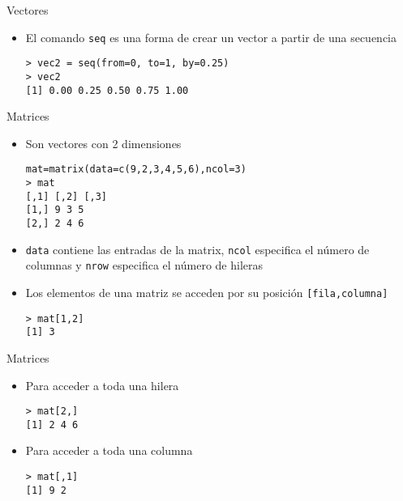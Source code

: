 \documentclass{beamer}
\begin{document}
\begin{frame}[fragile]{Vectores}
\begin{itemize}
\item El comando \verb=seq= es una forma de crear un vector a partir de una secuencia
\begin{verbatim}
> vec2 = seq(from=0, to=1, by=0.25)
> vec2
[1] 0.00 0.25 0.50 0.75 1.00
\end{verbatim}
\end{itemize}
\end{frame}

\begin{frame}[fragile]{Matrices}
\begin{itemize}
\item Son vectores con 2 dimensiones
\begin{verbatim}
mat=matrix(data=c(9,2,3,4,5,6),ncol=3)
> mat
[,1] [,2] [,3]
[1,] 9 3 5
[2,] 2 4 6
\end{verbatim}
\item \verb=data= contiene las entradas de la matrix, \verb=ncol= especifica el número de columnas y \verb=nrow= especifica el número de hileras
\item Los elementos de una matriz se acceden por su posición \texttt{[fila,columna]}
\begin{verbatim}
> mat[1,2]
[1] 3
\end{verbatim}
\end{itemize}
\end{frame}

\begin{frame}[fragile]{Matrices}
\begin{itemize}
\item Para acceder a toda una hilera
\begin{verbatim}
> mat[2,]
[1] 2 4 6
\end{verbatim}
\item Para acceder a toda una columna
\begin{verbatim}
> mat[,1]
[1] 9 2
\end{verbatim}
\end{itemize}
\end{frame}
\end{document}
